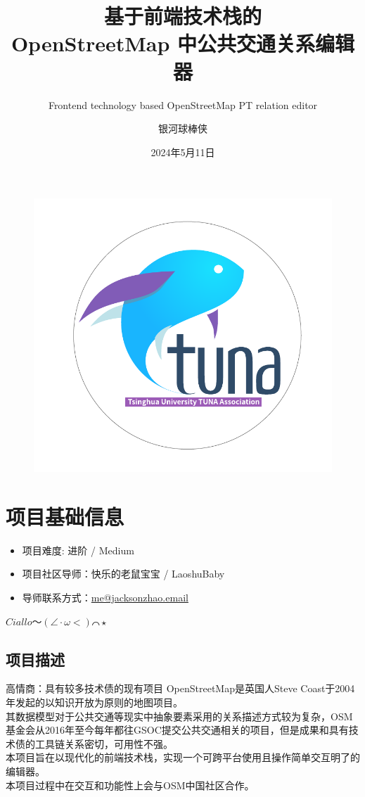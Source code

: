 \documentclass{beamer}
\author{银河球棒侠}
\title{基于前端技术栈的\\ OpenStreetMap 中公共交通关系编辑器}
\subtitle{Frontend technology based OpenStreetMap PT relation editor}
\institute{OSMChina}
\date{2024年5月11日}
\begin{document}
\kaishu
\begin{frame}
    \titlepage
    \begin{figure}[htpb]
        \begin{center}
            \includegraphics[width=0.2\linewidth]{figure/tuna.pdf}
        \end{center}
    \end{figure}
\end{frame}

\begin{frame}
    \tableofcontents[sectionstyle=show,subsectionstyle=show/shaded/hide,subsubsectionstyle=show/shaded/hide]
\end{frame}

\section{项目基础信息}

\begin{frame}
    \begin{itemize}
        \item 项目难度: 进阶 / Medium
        \item 项目社区导师：快乐的老鼠宝宝 / LaoshuBaby
        \item 导师联系方式：\href{mailto:me@jacksonzhao.email}{me@jacksonzhao.email}
    \end{itemize}
    \vspace{1.5em}
    $ Ciallo\text{～}(\angle\cdot\omega< )\text{⌒}\star $
\end{frame}

\subsection{项目描述}

\begin{frame}{高情商：具有较多技术债的现有项目}
    \quad \quad OpenStreetMap是英国人Steve Coast于2004年发起的以知识开放为原则的地图项目。\\
    \quad \quad 其数据模型对于公共交通等现实中抽象要素采用的关系描述方式较为复杂，OSM基金会从2016年至今每年都往GSOC提交公共交通相关的项目，但是成果和具有技术债的工具链关系密切，可用性不强。\\
    \quad \quad 本项目旨在以现代化的前端技术栈，实现一个可跨平台使用且操作简单交互明了的编辑器。\\
    \quad \quad 本项目过程中在交互和功能性上会与OSM中国社区合作。
\end{frame}
\end{document}
